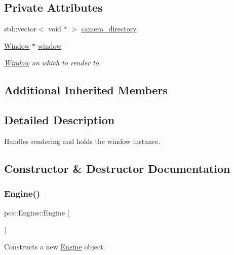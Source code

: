 \subsection*{Private Attributes}
\begin{DoxyCompactItemize}
\item 
std\+::vector$<$ void $\ast$ $>$ \hyperlink{classpcs_1_1Engine_ad004e5859bca9815210a0f3786b83a02}{camera\+\_\+directory}
\item 
\hyperlink{classpcs_1_1Window}{Window} $\ast$ \hyperlink{classpcs_1_1Engine_a9d6dcbb93509389d86beb46ba33371a1}{window}
\begin{DoxyCompactList}\small\item\em \hyperlink{classpcs_1_1Window}{Window} on which to render to. \end{DoxyCompactList}\end{DoxyCompactItemize}
\subsection*{Additional Inherited Members}


\subsection{Detailed Description}
Handles rendering and holds the window instance. 

\subsection{Constructor \& Destructor Documentation}
\mbox{\label{classpcs_1_1Engine_a73a5c3ce66c2c033835f19f95b67f3ea}} 
\subsubsection{\texorpdfstring{Engine()}{Engine()}}
{\footnotesize\ttfamily pcs\+::\+Engine\+::\+Engine (\begin{DoxyParamCaption}{ }\end{DoxyParamCaption})}



Constructs a new \hyperlink{classpcs_1_1Engine}{Engine} object. 

\mbox{\label{classpcs_1_1Engine_aa6a523009abf3a61d9682a846c780207}} 
